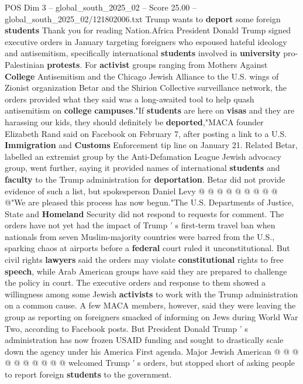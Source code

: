 \begin{textsample}{POS Dim 3 – global\_south\_2025\_02 – Score 25.00 – global\_south\_2025\_02/121802006.txt}  \label{ex:f3_pos_409}
Trump wants to \textbf{deport} some foreign \textbf{students} Thank you for reading Nation.Africa President Donald Trump signed executive orders in January targeting foreigners who espoused hateful ideology and antisemitism, specifically international \textbf{students} involved in \textbf{university} pro-Palestinian \textbf{protests}.
For \textbf{activist} groups ranging from Mothers Against \textbf{College} Antisemitism and the Chicago Jewish Alliance to the U.S. wings of Zionist organization Betar and the Shirion Collective surveillance network, the orders provided what they said was a long-awaited tool to help quash antisemitism on \textbf{college} \textbf{campuses}."If \textbf{students} are here on \textbf{visas} and they are harassing our kids, they should definitely be \textbf{deported},"MACA founder Elizabeth Rand said on Facebook on February 7, after posting a link to a U.S. \textbf{Immigration} and \textbf{Customs} Enforcement tip line on January 21.
Related Betar, labelled an extremist group by the Anti-Defamation League Jewish advocacy group, went further, saying it provided names of international \textbf{students} and \textbf{faculty} to the Trump administration for \textbf{deportation}.
Betar did not provide evidence of such a list, but spokesperson Daniel Levy @ @ @ @ @ @ @ @ @ @"We are pleased this process has now begun."The U.S.
Departments of Justice, State and \textbf{Homeland} Security did not respond to requests for comment.
The orders have not yet had the impact of Trump ' s first-term travel ban when nationals from seven Muslim-majority countries were barred from the U.S., sparking chaos at airports before a \textbf{federal} court ruled it unconstitutional.
But civil rights \textbf{lawyers} said the orders may violate \textbf{constitutional} rights to free \textbf{speech}, while Arab American groups have said they are prepared to challenge the policy in court.
The executive orders and response to them showed a willingness among some Jewish \textbf{activists} to work with the Trump administration on a common cause.
A few MACA members, however, said they were leaving the group as reporting on foreigners smacked of informing on Jews during World War Two, according to Facebook posts.
But President Donald Trump ' s administration has now frozen USAID funding and sought to drastically scale down the agency under his America First agenda.
Major Jewish American @ @ @ @ @ @ @ @ @ @ welcomed Trump ' s orders, but stopped short of asking people to report foreign \textbf{students} to the government.

\end{textsample}
